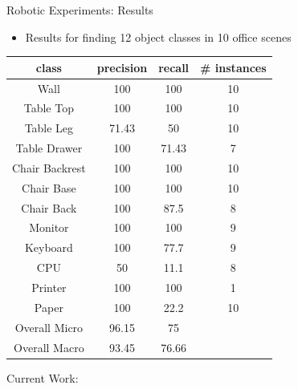 \documentclass{beamer}
\begin{document}
\begin{frame}{Robotic Experiments: Results}

\begin{itemize}

\item Results for finding 12 object classes in 10 office scenes

\end{itemize}

\begin {center}
{\footnotesize 
\begin{tabular}{c | c | c | c}
class & precision & recall & \# instances\\
\hline
Wall  & 100 & 100 & 10\\
Table Top  & 100  &100 & 10 \\
Table Leg & 71.43 & 50 & 10 \\
Table Drawer & 100 & 71.43 & 7\\
Chair Backrest & 100 & 100 & 10 \\
Chair Base & 100  & 100 & 10 \\
Chair Back & 100 & 87.5 & 8 \\
Monitor & 100 & 100 & 9 \\
Keyboard & 100 & 77.7 & 9\\
CPU & 50 & 11.1 & 8 \\ 
Printer & 100 & 100 & 1\\
Paper & 100 & 22.2 & 10\\
\hline
Overall Micro & 96.15 & 75 \\
Overall Macro & 93.45 & 76.66 \\

\end{tabular}
}
\end{center}

\end{frame}

\begin{frame}{Current Work: }


\end{frame}
\end{document}
